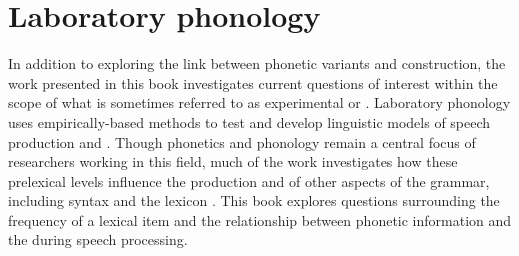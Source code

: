 \section{Laboratory phonology}
In addition to exploring the link between phonetic variants and  construction, the work presented in this book investigates current questions of interest within the scope of what is sometimes referred to as experimental or . Laboratory phonology uses empirically-based methods to test and develop linguistic models of speech production and . Though phonetics and phonology remain a central focus of researchers working in this field, much of the work investigates how these prelexical levels influence the production and  of other aspects of the grammar, including syntax \citep{haybresnan2006} and the lexicon \citep{bybee2002,gahl-thyme}. This book explores questions surrounding the frequency of a lexical item and the relationship between phonetic information and the  during speech processing.
 
	
